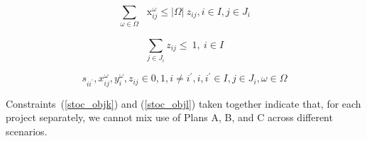 \begin{equation}\label{stoc_objk}
 \sum _{ \omega  \in  \Omega }^{}\text{~ x}_{ij}^{ \omega } \leq   \vert  \Omega  \vert ~z_{ij} ,i \in I, j \in J_{i}
\end{equation}

\begin{equation}\label{stoc_objl}
 \sum _{j \in J_{i}}^{}z_{ij} \leq ~1,~  i \in I
\end{equation}

\begin{equation}\label{stoc_objm}
s_{ii^{'}},x_{ij}^{ \omega },y_{i}^{ \omega },z_{ij} \in { 0,1 } , i \neq i^{'},i,i^{'} \in I, j \in J_{i} ,  \omega  \in  \Omega
\end{equation}

Constraints~(\ref{stoc_objk}) and (\ref{stoc_objl}) taken together indicate that, for each
project separately, we cannot mix use of Plans A, B, and C across different scenarios.

